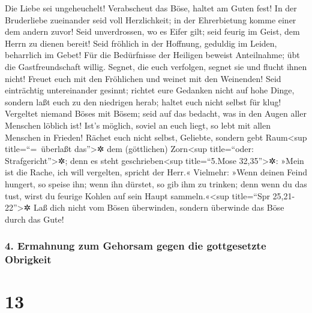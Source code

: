  Die Liebe sei ungeheuchelt! Verabscheut das Böse, haltet
am Guten fest!  In der Bruderliebe zueinander seid voll
Herzlichkeit; in der Ehrerbietung komme einer dem andern zuvor!
 Seid unverdrossen, wo es Eifer gilt; seid feurig im
Geist, dem Herrn zu dienen bereit!  Seid fröhlich in der
Hoffnung, geduldig im Leiden, beharrlich im Gebet!  Für
die Bedürfnisse der Heiligen beweist Anteilnahme; übt die
Gastfreundschaft willig.  Segnet, die euch verfolgen,
segnet sie und flucht ihnen nicht!  Freuet euch mit den
Fröhlichen und weinet mit den Weinenden!  Seid
einträchtig untereinander gesinnt; richtet eure Gedanken nicht auf hohe
Dinge, sondern laßt euch zu den niedrigen herab; haltet euch nicht
selbst für klug!  Vergeltet niemand Böses mit Bösem; seid
auf das bedacht, was in den Augen aller Menschen löblich ist!
 Ist's möglich, soviel an euch liegt, so lebt mit allen
Menschen in Frieden!  Rächet euch nicht selbst, Geliebte,
sondern gebt Raum\textless sup title=``=~überlaßt das''\textgreater✲ dem
(göttlichen) Zorn\textless sup title=``oder:
Strafgericht''\textgreater✲; denn es steht geschrieben\textless sup
title=``5.Mose 32,35''\textgreater✲: »Mein ist die Rache, ich will
vergelten, spricht der Herr.«  Vielmehr: »Wenn deinen
Feind hungert, so speise ihn; wenn ihn dürstet, so gib ihm zu trinken;
denn wenn du das tust, wirst du feurige Kohlen auf sein Haupt
sammeln.«\textless sup title=``Spr 25,21-22''\textgreater✲
 Laß dich nicht vom Bösen überwinden, sondern überwinde
das Böse durch das Gute!

\hypertarget{ermahnung-zum-gehorsam-gegen-die-gottgesetzte-obrigkeit}{%
\subsubsection{4. Ermahnung zum Gehorsam gegen die gottgesetzte
Obrigkeit}\label{ermahnung-zum-gehorsam-gegen-die-gottgesetzte-obrigkeit}}

\hypertarget{section-12}{%
\section{13}\label{section-12}}

